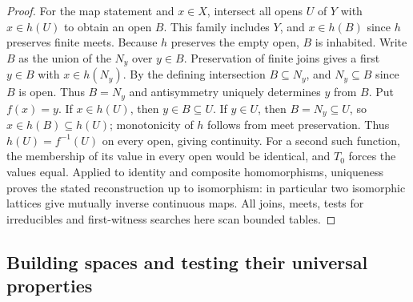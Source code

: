 \begin{proof}
For the map statement and $x\in X$, intersect all opens $U$ of $Y$ with
$x\in h(U)$ to obtain an open $B$. This family includes $Y$, and
$x\in h(B)$ since $h$ preserves finite meets. Because $h$ preserves the
empty open, $B$ is inhabited. Write $B$ as the union of the $N_y$ over
$y\in B$. Preservation of finite joins gives a first $y\in B$ with
$x\in h(N_y)$. By the defining intersection $B\subseteq N_y$, and
$N_y\subseteq B$ since $B$ is open. Thus $B=N_y$ and antisymmetry
uniquely determines $y$ from $B$. Put $f(x)=y$. If $x\in h(U)$, then
$y\in B\subseteq U$. If $y\in U$, then $B=N_y\subseteq U$, so
$x\in h(B)\subseteq h(U)$; monotonicity of $h$ follows from meet
preservation. Thus $h(U)=f^{-1}(U)$ on every open, giving continuity.
For a second such function, the membership of its value in every open
would be identical, and $T_0$ forces the values equal. Applied to identity
and composite homomorphisms, uniqueness proves the stated reconstruction
up to isomorphism: in particular two isomorphic lattices give mutually
inverse continuous maps. All joins, meets, tests for irreducibles and
first-witness searches here scan bounded tables.
\end{proof}

\subsection{Building spaces and testing their universal properties}

